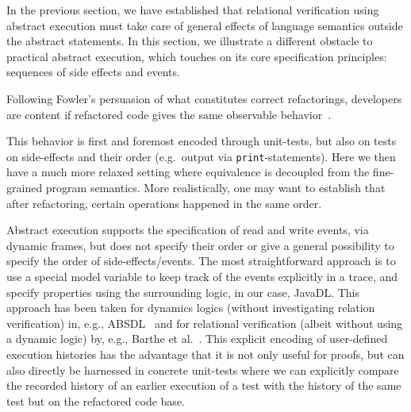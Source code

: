In the previous section, we have established that relational verification using abstract execution
must take care of general effects of language semantics outside the abstract statements.
In this section, we illustrate a different obstacle to practical abstract execution, which touches on its core specification principles: sequences of side effects and events.

Following Fowler's persuasion of what constitutes correct refactorings, developers are content if refactored code gives the same observable behavior~\cite{fowler:refactoring2nd}.

This behavior is first and foremost encoded through unit-tests, but also on tests on side-effects and their order (e.g.\ output via \texttt{print}-statements).
Here we then have a much more relaxed setting where equivalence is decoupled from the fine-grained program semantics.
More realistically, one may want to establish that after refactoring, certain operations happened in the same order.

Abstract execution supports the specification of read and write events, via dynamic frames, but does not specify their order or give a general possibility to
specify the order of side-effects/events. The most straightforward approach is to use a special model variable to keep track of the events explicitly in a trace, 
and specify properties using the surrounding logic, in our case, JavaDL. This approach has been taken for dynamics logics (without investigating relation verification) in, e.g., ABSDL~\cite{DBLP:journals/jlp/DinO14} and for relational verification (albeit without using a dynamic logic) by, e.g., Barthe et al.~\cite{DBLP:conf/fmcad/BartheEGGKM19}.
This explicit encoding of user-defined execution histories has the advantage that it is not only useful for proofs, but can also directly be harnessed in concrete unit-tests where we can explicitly compare the recorded history of an earlier execution of a test with the history of the same test but on the refactored code base.


